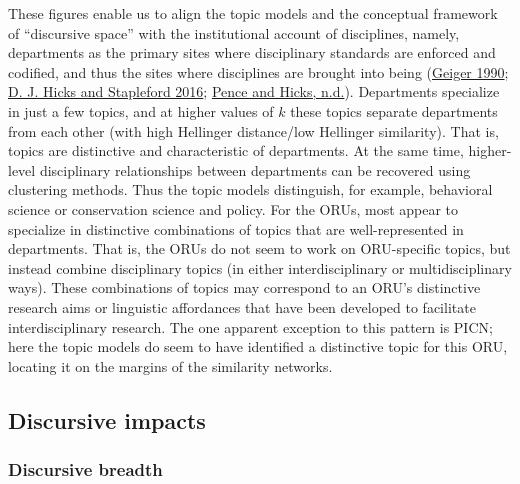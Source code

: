 \documentclass[
  11pt,
]{article}
\begin{document}
These figures enable us to align the topic models and the conceptual framework of ``discursive space'' with the institutional account of disciplines, namely, departments as the primary sites where disciplinary standards are enforced and codified, and thus the sites where disciplines are brought into being (\protect\hyperlink{ref-GeigerOrganizedResearchUnits1990}{Geiger 1990}; \protect\hyperlink{ref-HicksVirtuesScientificPractice2016}{D. J. Hicks and Stapleford 2016}; \protect\hyperlink{ref-PenceChallengesCommunityScience}{Pence and Hicks, n.d.}). Departments specialize in just a few topics, and at higher values of \(k\) these topics separate departments from each other (with high Hellinger distance/low Hellinger similarity). That is, topics are distinctive and characteristic of departments. At the same time, higher-level disciplinary relationships between departments can be recovered using clustering methods. Thus the topic models distinguish, for example, behavioral science or conservation science and policy. For the ORUs, most appear to specialize in distinctive combinations of topics that are well-represented in departments. That is, the ORUs do not seem to work on ORU-specific topics, but instead combine disciplinary topics (in either interdisciplinary or multidisciplinary ways). These combinations of topics may correspond to an ORU's distinctive research aims or linguistic affordances that have been developed to facilitate interdisciplinary research. The one apparent exception to this pattern is PICN; here the topic models do seem to have identified a distinctive topic for this ORU, locating it on the margins of the similarity networks.

\hypertarget{discursive-impacts-2}{%
\subsection{Discursive impacts}\label{discursive-impacts-2}}

\hypertarget{discursive-breadth}{%
\subsubsection{Discursive breadth}\label{discursive-breadth}}
\end{document}
